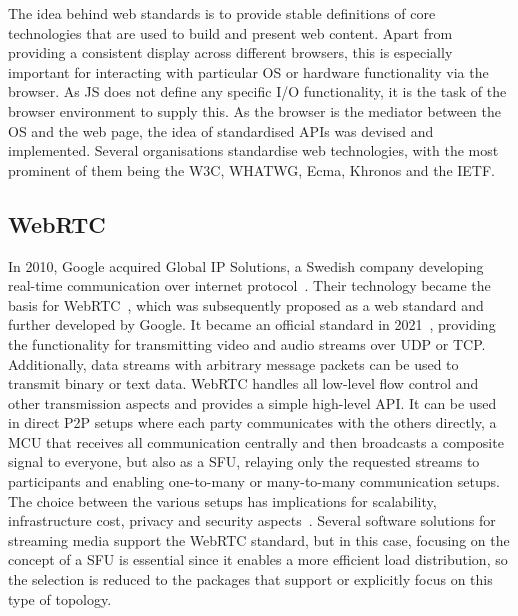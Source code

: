 The idea behind web standards is to provide stable definitions of core technologies that are used to build and present web content.
Apart from providing a consistent display across different browsers, this is especially important for interacting with particular \ac{OS} or hardware functionality via the browser.
As \ac{JS} does not define any specific \ac{I/O} functionality, it is the task of the browser environment to supply this.
As the browser is the mediator between the \ac{OS} and the web page, the idea of standardised \ac{API}s was devised and implemented.
Several organisations standardise web technologies, with the most prominent of them being the \ac{W3C}, \ac{WHATWG}, Ecma, Khronos and the \ac{IETF}.

\subsection{WebRTC}
\label{subsec:webrtc}

In 2010, Google acquired Global IP Solutions, a Swedish company developing real-time communication over internet protocol~\parencite{googleGlobalIpAcquisition}.
Their technology became the basis for \ac{WebRTC}~\parencite{webRtcGlobalIPSolutions}, which was subsequently proposed as a web standard and further developed by Google.
It became an official standard in 2021~\parencite{webRtcOfficialWebStandard}, providing the functionality for transmitting video and audio streams over \ac{UDP} or \ac{TCP}.
Additionally, data streams with arbitrary message packets can be used to transmit binary or text data.
WebRTC handles all low-level flow control and other transmission aspects and provides a simple high-level \ac{API}.
It can be used in direct \ac{P2P} setups where each party communicates with the others directly, a \ac{MCU} that receives all communication centrally and then broadcasts a composite signal to everyone, but also as a \ac{SFU}, relaying only the requested streams to participants and enabling one-to-many or many-to-many communication setups.
The choice between the various setups has implications for scalability, infrastructure cost, privacy and security aspects~\parencite{webRtcArchitectures}.
Several software solutions for streaming media support the \ac{WebRTC} standard, but in this case, focusing on the concept of a \ac{SFU} is essential since it enables a more efficient load distribution, so the selection is reduced to the packages that support or explicitly focus on this type of topology.



